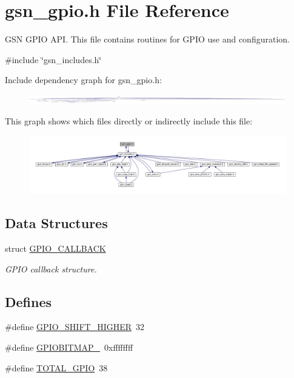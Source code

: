 \hypertarget{a00503}{
\section{gsn\_\-gpio.h File Reference}
\label{a00503}
}


GSN GPIO API. This file contains routines for GPIO use and configuration.  


{\ttfamily \#include \char`\"{}gsn\_\-includes.h\char`\"{}}\par
Include dependency graph for gsn\_\-gpio.h:
\nopagebreak
\begin{figure}[H]
\begin{center}
\leavevmode
\includegraphics[width=400pt]{a00733}
\end{center}
\end{figure}
This graph shows which files directly or indirectly include this file:
\nopagebreak
\begin{figure}[H]
\begin{center}
\leavevmode
\includegraphics[width=400pt]{a00734}
\end{center}
\end{figure}
\subsection*{Data Structures}
\begin{DoxyCompactItemize}
\item 
struct \hyperlink{a00018}{GPIO\_\-CALLBACK}
\begin{DoxyCompactList}\small\item\em GPIO callback structure. \end{DoxyCompactList}\end{DoxyCompactItemize}
\subsection*{Defines}
\begin{DoxyCompactItemize}
\item 
\#define \hyperlink{a00503_adaab8557299a2f70ac7f00d23f028453}{GPIO\_\-SHIFT\_\-HIGHER}~32
\item 
\#define \hyperlink{a00503_a72bfa1f319c6cdd63346a31c1fb3b723}{GPIOBITMAP\_}~0xffffffff
\item 
\#define \hyperlink{a00503_a1ea459cccfd26612a14ddeec488a2e92}{TOTAL\_\-GPIO}~38
\end{DoxyCompactItemize}

